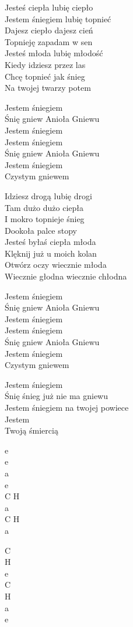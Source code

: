 \begin{text}
    Jesteś ciepła lubię ciepło\\
    Jestem śniegiem lubię topnieć\\
    Dajesz ciepło dajesz cień\\
    Topnieję zapadam w sen\\
    Jesteś młoda lubię młodość\\
    Kiedy idziesz przez las\\
    Chcę topnieć jak śnieg\\
    Na twojej twarzy potem

    Jestem śniegiem\\
    Śnię gniew Anioła Gniewu\\
    Jestem śniegiem\\
    Jestem śniegiem\\
    Śnię gniew Anioła Gniewu\\
    Jestem śniegiem\\
    Czystym gniewem

    Idziesz drogą lubię drogi\\
    Tam dużo dużo ciepła\\
    I mokro topnieje śnieg\\
    Dookoła palce stopy\\
    Jesteś byłaś ciepła młoda\\
    Klęknij już u moich kolan\\
    Otwórz oczy wiecznie młoda\\
    Wiecznie głodna wiecznie chłodna

    Jestem śniegiem\\
    Śnię gniew Anioła Gniewu\\
    Jestem śniegiem\\
    Jestem śniegiem\\
    Śnię gniew Anioła Gniewu\\
    Jestem śniegiem\\
    Czystym gniewem

    Jestem śniegiem\\
    Śnię śnieg już nie ma gniewu\\
    Jestem śniegiem na twojej powiece\\
    Jestem\\
    Twoją śmiercią
\end{text}
\begin{chord}
    e\\
    e\\
    a\\
    e\\
    C H\\
    a\\
    C H\\
    a

    C\\
    H\\
    e\\
    C\\
    H\\
    a\\
    e
\end{chord}